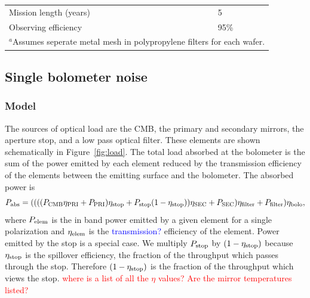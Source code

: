 \documentclass[]{spie}  %
\newcommand{\comr}[1]{\textcolor{red}{#1}}
\newcommand{\comb}[1]{\textcolor{blue}{#1}}
\begin{document}
\begin{table}[ht]
\begin{tabular}{|l|l|}
Mission length (years)           & 5                                                \\
Observing efficiency             & 95\%                                             \\
\hline
\multicolumn{2}{l}{\footnotesize $^a$Assumes seperate metal mesh in polypropylene filters for each wafer.}
\end{tabular}
\end{table}


\subsection{Single bolometer noise}
\label{sec:det_noise}

\subsubsection{Model}

The sources of optical load are the CMB, the primary and secondary mirrors, the aperture stop, and a low pass optical filter.  
These elements are shown schematically in Figure~\ref{fig:load}. 
The total load absorbed at the bolometer is the sum of the power emitted by each element reduced by the transmission 
efficiency of the elements between the emitting surface and the bolometer.  
The absorbed power is
\begin{equation}
\label{eq:load}
P_{\rm abs} =  (((( P_{\rm CMB} \eta_{\rm PRI} + P_{\rm PRI} ) \eta_{\rm stop} + P_{\rm stop}(1-\eta_{\rm stop}) ) \eta_{\rm SEC} + P_{\rm SEC})\eta_{\rm filter} + P_{\rm filter}) \eta_{\rm bolo},
\end{equation} 
where $P_{\rm elem}$ is the in band power emitted by a given element for a single polarization and $\eta_{\rm elem}$ is the 
\comb{transmission?} efficiency 
of the element. Power emitted by the stop is a special case. We multiply $P_{\rm stop}$ by 
$(1-\eta_{\rm stop})$ because $\eta_{\rm stop}$ is the spillover efficiency, the fraction of the throughput which passes through the 
stop. Therefore $(1-\eta_{\rm stop})$ is the fraction of the throughput which views the stop. \comr{where is a list of all the $\eta$ values?
Are the mirror temperatures listed? }
\end{document}
